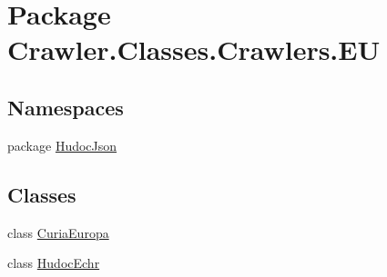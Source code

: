 \hypertarget{namespace_crawler_1_1_classes_1_1_crawlers_1_1_e_u}{\section{Package Crawler.\-Classes.\-Crawlers.\-E\-U}
\label{namespace_crawler_1_1_classes_1_1_crawlers_1_1_e_u}
}
\subsection*{Namespaces}
\begin{DoxyCompactItemize}
\item 
package \hyperlink{namespace_crawler_1_1_classes_1_1_crawlers_1_1_e_u_1_1_hudoc_json}{Hudoc\-Json}
\end{DoxyCompactItemize}
\subsection*{Classes}
\begin{DoxyCompactItemize}
\item 
class \hyperlink{class_crawler_1_1_classes_1_1_crawlers_1_1_e_u_1_1_curia_europa}{Curia\-Europa}
\item 
class \hyperlink{class_crawler_1_1_classes_1_1_crawlers_1_1_e_u_1_1_hudoc_echr}{Hudoc\-Echr}
\end{DoxyCompactItemize}
